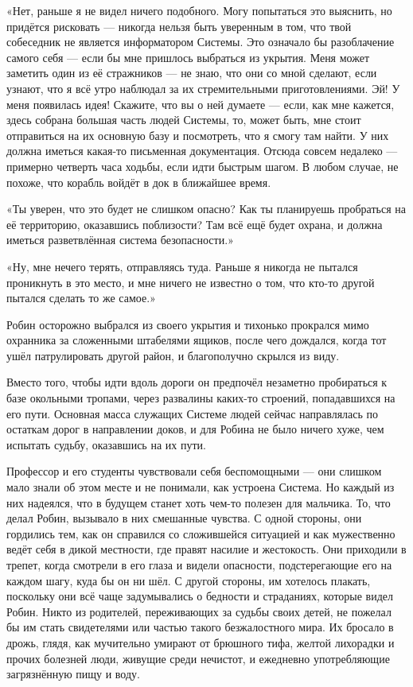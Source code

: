 \documentclass[a5paper, 9pt,
final, openany, twoside=true]{memoir}
\begin{document}
«Нет, раньше я не видел ничего подобного. Могу попытаться это выяснить, но придётся рисковать — никогда нельзя быть уверенным в том, что твой собеседник не является информатором Системы. Это означало бы разоблачение самого себя — если бы мне пришлось выбраться из укрытия. Меня может заметить один из её стражников — не знаю, что они со мной сделают, если узнают, что я всё утро наблюдал за их стремительными приготовлениями. Эй! У меня появилась идея! Скажите, что вы о ней думаете — если, как мне кажется, здесь собрана большая часть людей Системы, то, может быть, мне стоит отправиться на их основную базу и посмотреть, что я смогу там найти. У них должна иметься какая-то письменная документация. Отсюда совсем недалеко — примерно четверть часа ходьбы, если идти быстрым шагом. В любом случае, не похоже, что корабль войдёт в док в ближайшее время.

«Ты уверен, что это будет не слишком опасно? Как ты планируешь пробраться на её территорию, оказавшись поблизости? Там всё ещё будет охрана, и должна иметься разветвлённая система безопасности.»

«Ну, мне нечего терять, отправляясь туда. Раньше я никогда не пытался проникнуть в это место, и мне ничего не известно о том, что кто-то другой пытался сделать то же самое.»\bigskip

Робин осторожно выбрался из своего укрытия и тихонько прокрался мимо охранника за сложенными штабелями ящиков, после чего дождался, когда тот ушёл патрулировать другой район, и благополучно скрылся из виду.

Вместо того, чтобы идти вдоль дороги он предпочёл незаметно пробираться к базе окольными тропами, через развалины каких-то строений, попадавшихся на его пути. Основная масса служащих Системе людей сейчас направлялась по остаткам дорог в направлении доков, и для Робина не было ничего хуже, чем испытать судьбу, оказавшись на их пути.

Профессор и его студенты чувствовали себя беспомощными — они слишком мало знали об этом месте и не понимали, как устроена Система. Но каждый из них надеялся, что в будущем станет хоть чем-то полезен для мальчика. То, что делал Робин, вызывало в них смешанные чувства. С одной стороны, они гордились тем, как он справился со сложившейся ситуацией и как мужественно ведёт себя в дикой местности, где правят насилие и жестокость. Они приходили в трепет, когда смотрели в его глаза и видели опасности, подстерегающие его на каждом шагу, куда бы он ни шёл. С другой стороны, им хотелось плакать, поскольку они всё чаще задумывались о бедности и страданиях, которые видел Робин. Никто из родителей, переживающих за судьбы своих детей, не пожелал бы им стать свидетелями или частью такого безжалостного мира. Их бросало в дрожь, глядя, как мучительно умирают от брюшного тифа, желтой лихорадки и прочих болезней люди, живущие среди нечистот, и ежедневно употребляющие загрязнённую пищу и воду.\bigskip
\end{document}
